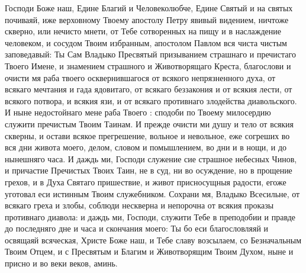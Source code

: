\begin{mymulticols}
Господи Боже наш, Едине Благий и Человеколюбче, Едине Святый и на святых почиваяй, иже верховному Твоему апостолу Петру явивый видением, ничтоже скверно, или нечисто мнети, от Тебе сотворенных на пищу и в наслаждение человеком, и сосудом Твоим избранным, апостолом Павлом вся чиста чистым заповедавый: Ты Сам Владыко Пресвятый призыванием страшнаго и пречистаго Твоего Имене, и знамением страшного и Животворящаго Креста, благослови и очисти мя раба твоего  осквернившагося от всякого непрязненного духа, от всякаго мечтания и гада ядовитаго, от всякаго беззакония и от всякия лести, от всякого потвора, и всякия язи, и от всякаго противнаго злодейства диавольского. И ныне недостойнаго мене раба Твоего : сподоби по Твоему милосердию служити пречистым Твоим Таинам. И прежде очисти ми душу и тело от всякия скверны, и остави всякое прегрешение, вольное и невольное, еже согреших во вся дни живота моего, делом, словом и помышлением, во дни и в нощи, и до нынешняго часа. И даждь ми, Господи служение сие страшное небесных Чинов, и причастие Пречистых Твоих Таин, не в суд, ни во осуждение, но в прощение грехов, и в Духа Святаго пришествие, и живот присносущныя радости, егоже уготовал еси истинным Твоим служебником. Сохрани мя, Владыко Всесильне, от всякаго греха и злобы, соблюди нескверна и непорочна от всякия проказы противнаго диавола: и даждь ми, Господи, служити Тебе в преподобии и правде до последняго дне и часа и скончания моего: Ты бо еси благословляяй и освящаяй всяческая, Христе Боже наш, и Тебе славу возсылаем, со Безначальным Твоим Отцем, и с Пресвятым и Благим и Животворящим Твоим Духом, ныне и присно и во веки веков, аминь.

\end{mymulticols}

\mychapterending



\tolkopoblagosloveniyu

